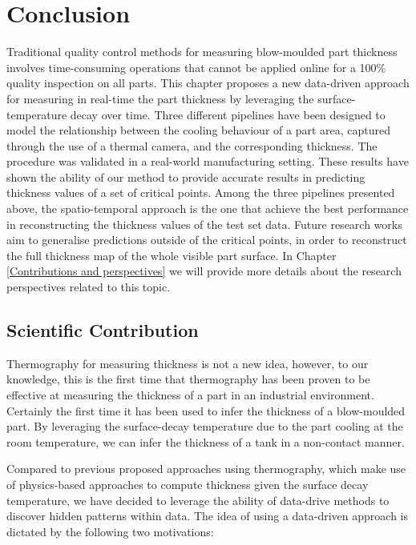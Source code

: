 
\section{Conclusion}

Traditional quality control methods for measuring blow-moulded part thickness involves time-consuming operations that cannot be applied online for a 100\% quality inspection on all parts. This chapter proposes a new data-driven approach for measuring in real-time the part thickness by leveraging the surface-temperature decay over time. Three different pipelines have been designed to model the relationship between the cooling behaviour of a part area, captured through the use of a thermal camera, and the corresponding thickness. The procedure was validated in a real-world manufacturing setting. These results have shown the ability of our method to provide accurate results in predicting thickness values of a set of critical points. Among the three pipelines presented above, the spatio-temporal approach is the one that achieve the best performance in reconstructing the thickness values of the test set data. Future research works aim to generalise predictions outside of the critical points, in order to reconstruct the full thickness map of the whole visible part surface. In Chapter \ref{Contributions and perspectives} we will provide more details about the research perspectives related to this topic. 

\subsection{Scientific Contribution}

Thermography for measuring thickness is not a new idea, however, to our knowledge, this is the first time that thermography has been proven to be effective at measuring the thickness of a part in an industrial environment. Certainly the first time it has been used to infer the thickness of a blow-moulded part. By leveraging the surface-decay temperature due to the part cooling at the room temperature, we can infer the thickness of a tank in a non-contact manner.

Compared to previous proposed approaches using thermography, which make use of physics-based approaches to compute thickness given the surface decay temperature, we have decided to leverage the ability of data-drive methods to discover hidden patterns within data. The idea of using a data-driven approach is dictated by the following two motivations:

